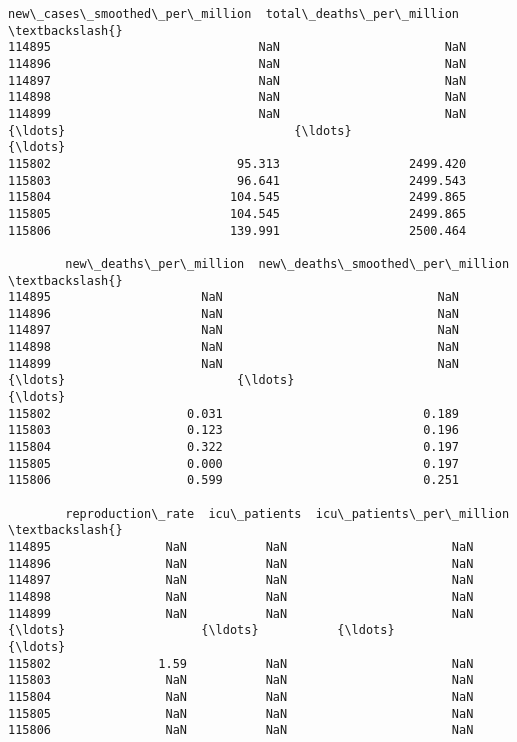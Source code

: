 \documentclass[11pt]{article}
\begin{document}
\begin{tcolorbox}[breakable, size=fbox, boxrule=.5pt, pad at break*=1mm, opacityfill=0]
\begin{Verbatim}[commandchars=\\\{\}]
        new\_cases\_smoothed\_per\_million  total\_deaths\_per\_million  \textbackslash{}
114895                             NaN                       NaN
114896                             NaN                       NaN
114897                             NaN                       NaN
114898                             NaN                       NaN
114899                             NaN                       NaN
{\ldots}                                {\ldots}                       {\ldots}
115802                          95.313                  2499.420
115803                          96.641                  2499.543
115804                         104.545                  2499.865
115805                         104.545                  2499.865
115806                         139.991                  2500.464

        new\_deaths\_per\_million  new\_deaths\_smoothed\_per\_million  \textbackslash{}
114895                     NaN                              NaN
114896                     NaN                              NaN
114897                     NaN                              NaN
114898                     NaN                              NaN
114899                     NaN                              NaN
{\ldots}                        {\ldots}                              {\ldots}
115802                   0.031                            0.189
115803                   0.123                            0.196
115804                   0.322                            0.197
115805                   0.000                            0.197
115806                   0.599                            0.251

        reproduction\_rate  icu\_patients  icu\_patients\_per\_million  \textbackslash{}
114895                NaN           NaN                       NaN
114896                NaN           NaN                       NaN
114897                NaN           NaN                       NaN
114898                NaN           NaN                       NaN
114899                NaN           NaN                       NaN
{\ldots}                   {\ldots}           {\ldots}                       {\ldots}
115802               1.59           NaN                       NaN
115803                NaN           NaN                       NaN
115804                NaN           NaN                       NaN
115805                NaN           NaN                       NaN
115806                NaN           NaN                       NaN


\end{Verbatim}
\end{tcolorbox}
\end{document}
